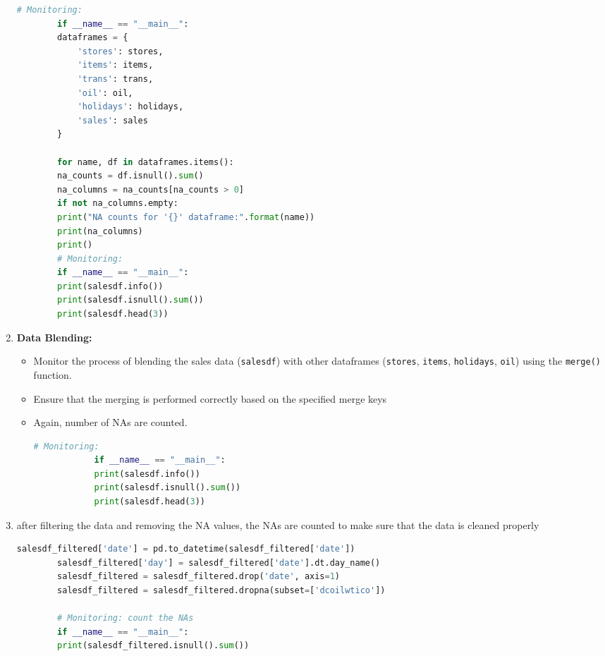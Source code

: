 \begin{enumerate}
	\begin{lstlisting}[language=Python]
		# Monitoring:
		if __name__ == "__main__":
		dataframes = {
			'stores': stores,
			'items': items,
			'trans': trans,
			'oil': oil,
			'holidays': holidays,
			'sales': sales
		}
		
		for name, df in dataframes.items():
		na_counts = df.isnull().sum()
		na_columns = na_counts[na_counts > 0]
		if not na_columns.empty:
		print("NA counts for '{}' dataframe:".format(name))
		print(na_columns)
		print()
		# Monitoring:
		if __name__ == "__main__":
		print(salesdf.info())
		print(salesdf.isnull().sum())
		print(salesdf.head(3))
	\end{lstlisting}
	
	
	\item \textbf{Data Blending:}
	\begin{itemize}
		\item Monitor the process of blending the sales data (\texttt{salesdf}) with other dataframes (\texttt{stores}, \texttt{items}, \texttt{holidays}, \texttt{oil}) using the \texttt{merge()} function.
		\item Ensure that the merging is performed correctly based on the specified merge keys 
		\item Again, number of NAs are counted.
		
		\begin{lstlisting}[language=Python]
			# Monitoring:
			if __name__ == "__main__":
			print(salesdf.info())
			print(salesdf.isnull().sum())
			print(salesdf.head(3))
		\end{lstlisting}
		
	\end{itemize}
	
	
	\item after filtering the data and removing the NA values, the NAs are counted to make sure that the data is cleaned properly
	
	\begin{lstlisting}[language=Python]
		salesdf_filtered['date'] = pd.to_datetime(salesdf_filtered['date'])
		salesdf_filtered['day'] = salesdf_filtered['date'].dt.day_name()
		salesdf_filtered = salesdf_filtered.drop('date', axis=1)
		salesdf_filtered = salesdf_filtered.dropna(subset=['dcoilwtico'])
		
		# Monitoring: count the NAs
		if __name__ == "__main__":
		print(salesdf_filtered.isnull().sum())
	\end{lstlisting}
	

\end{enumerate}
